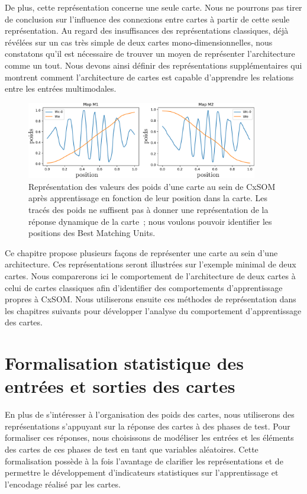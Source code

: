 \documentclass[../main]{subfiles}
\begin{document}
De plus, cette représentation concerne une seule carte. Nous ne pourrons pas tirer de conclusion sur l'influence des connexions entre cartes à partir de cette seule représentation.
Au regard des insuffisances des représentations classiques, déjà révélées sur un cas très simple de deux cartes mono-dimensionnelles, nous constatons qu'il est nécessaire de trouver un moyen de représenter l'architecture comme un tout. 
Nous devons ainsi définir des représentations supplémentaires qui montrent comment l'architecture de cartes est capable d'apprendre les relations entre les entrées multimodales.

\begin{figure}
\centering
\includegraphics[width=0.9\textwidth]{weights_cercle1.pdf}
\caption{Représentation des valeurs des poids d'une carte au sein de CxSOM après apprentissage en fonction de leur position dans la carte. Les tracés des poids ne suffisent pas à donner une représentation de la réponse dynamique de la carte~; nous voulons pouvoir identifier les positions des Best Matching Units. \label{fig:weights}}
\end{figure}

Ce chapitre propose plusieurs façons de représenter une carte au sein d'une architecture.
Ces représentations seront illustrées sur l'exemple minimal de deux cartes.
Nous comparerons ici le comportement de l'architecture de deux cartes à celui de cartes classiques afin d'identifier des comportements d'apprentissage propres à CxSOM.
Nous utiliserons ensuite ces méthodes de représentation dans les chapitres suivants pour développer l'analyse du comportement d'apprentissage des cartes.

\section{Formalisation statistique des entrées et sorties des cartes}

En plus de s'intéresser à l'organisation des poids des cartes, nous utiliserons des représentations s'appuyant sur la réponse des cartes à des phases de test.
Pour formaliser ces réponses, nous choisissons de modéliser les entrées et les éléments des cartes de ces phases de test en tant que variables aléatoires.
Cette formalisation possède à la fois l'avantage de clarifier les représentations et de permettre le développement d'indicateurs statistiques sur l'apprentissage et l'encodage réalisé par les cartes.
\end{document}
